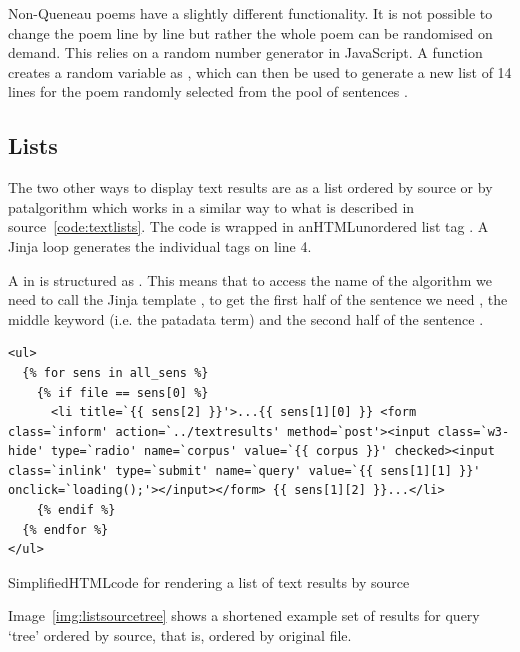 Non-Queneau poems have a slightly different functionality. It is not possible to change the poem line by line but rather the whole poem can be randomised on demand. This relies on a random number generator in JavaScript. A function  creates a random variable  as , which can then be used to generate a new list of 14 lines for the poem randomly selected from the pool of sentences .


\subsection{Lists}

The two other ways to display text results are as a list ordered by source or by patalgorithm which works in a similar way to what is described in source~\ref{code:textlists}. The code is wrapped in an\ac{HTML}unordered list tag . A Jinja  loop generates the individual  tags on line 4.

A  in  is structured as . This means that to access the name of the algorithm we need to call the Jinja template , to get the first half of the sentence we need , the middle keyword (i.e. the patadata term)  and the second half of the sentence .

\begin{listing}[!htbp] %
  \begin{verbatim}
<ul>
  {% for sens in all_sens %}
    {% if file == sens[0] %}
      <li title=`{{ sens[2] }}'>...{{ sens[1][0] }} <form class=`inform' action=`../textresults' method=`post'><input class=`w3-hide' type=`radio' name=`corpus' value=`{{ corpus }}' checked><input class=`inlink' type=`submit' name=`query' value=`{{ sens[1][1] }}' onclick=`loading();'></input></form> {{ sens[1][2] }}...</li>
    {% endif %}
  {% endfor %}
</ul>
  \end{verbatim}
\caption[HTML for results by source]{Simplified\ac{HTML}code for rendering a list of text results by source}
\label{code:textlists}
\end{listing}

Image~\ref{img:listsourcetree} shows a shortened example set of results for query `tree' ordered by source, that is, ordered by original file.

